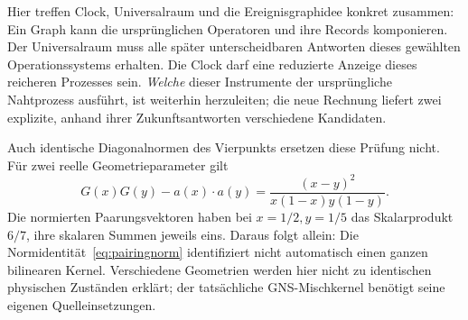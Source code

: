 \begin{center}
\end{center}


Hier treffen Clock, Universalraum und die Ereignisgraphidee konkret zusammen:
Ein Graph kann die ursprünglichen Operatoren und ihre Records komponieren. Der Universalraum muss alle später unterscheidbaren Antworten dieses gewählten Operationssystems erhalten. Die Clock darf eine reduzierte Anzeige dieses reicheren Prozesses sein. \emph{Welche} dieser Instrumente der ursprüngliche Nahtprozess ausführt, ist weiterhin herzuleiten; die neue Rechnung liefert zwei explizite, anhand ihrer Zukunftsantworten verschiedene Kandidaten.

Auch identische Diagonalnormen des Vierpunkts ersetzen diese Prüfung nicht. Für zwei reelle Geometrieparameter gilt
\begin{equation}
G(x)G(y)-a(x)\cdot a(y)
=\frac{(x-y)^2}{x(1-x)y(1-y)}.
\end{equation}
Die normierten Paarungsvektoren haben bei $x=1/2,y=1/5$ das Skalarprodukt $6/7$, ihre skalaren Summen jeweils eins. Daraus folgt allein: Die Normidentität~\eqref{eq:pairingnorm} identifiziert nicht automatisch einen ganzen bilinearen Kernel. Verschiedene Geometrien werden hier nicht zu identischen physischen Zuständen erklärt; der tatsächliche GNS-Mischkernel benötigt seine eigenen Quelleinsetzungen.

